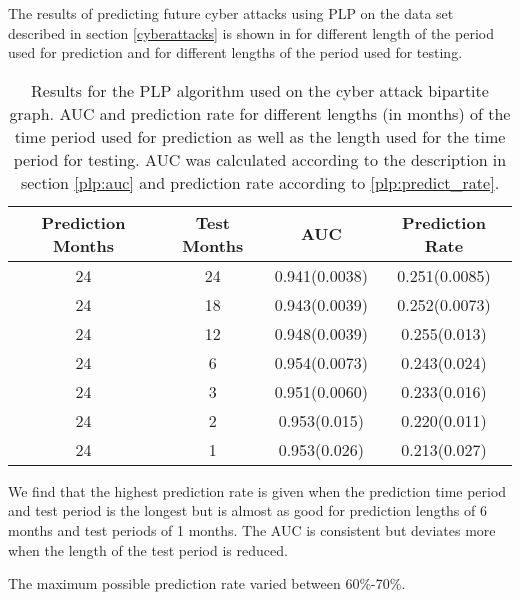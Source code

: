 The results of predicting future cyber attacks using PLP on the data set described in section \ref{cyberattacks} is shown in  for different length of the period used for prediction and for different lengths of the period used for testing.
\begin{table}[h!]
    \centering
    \begin{tabular}{|c|c|c|c|}
    \hline
        Prediction Months & Test Months & AUC            & Prediction Rate  \\ \hline
        24                & 24          & 0.941(0.0038)  & 0.251(0.0085)    \\
        24                & 18          & 0.943(0.0039)  & 0.252(0.0073)    \\
        24                & 12          & 0.948(0.0039)  & 0.255(0.013)     \\
        24                & 6           & 0.954(0.0073)  & 0.243(0.024)     \\
        24                & 3           & 0.951(0.0060)  & 0.233(0.016)     \\
        24                & 2           & 0.953(0.015)   & 0.220(0.011)     \\
        24                & 1           & 0.953(0.026)   & 0.213(0.027)     \\ \hline
    \end{tabular}
    \caption{\label{fig:plp_results} Results for the PLP algorithm used on the cyber attack bipartite graph. AUC and prediction rate for different lengths (in months) of the time period used for prediction as well as the length used for the time period for testing. AUC was calculated according to the description in section \ref{plp:auc} and prediction rate according to \ref{plp:predict_rate}.}
\end{table}

We find that the highest prediction rate is given when the prediction time period and test period is the longest but is almost as good for prediction lengths of 6 months and test periods of 1 months. The AUC is consistent but deviates more when the length of the test period is reduced.

The maximum possible prediction rate varied between 60\%-70\%.
